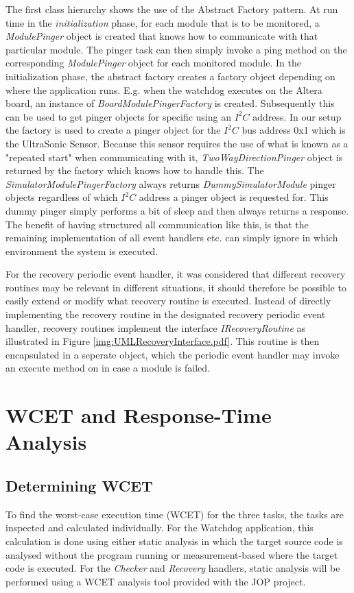 The first class hierarchy shows the use of the Abstract Factory pattern. At run time in the \emph{initialization} phase, for each module that is to be monitored, a \emph{ModulePinger} object is created that knows how to communicate with that particular module. The pinger task can then simply invoke a ping method on the corresponding \emph{ModulePinger} object for each monitored module. In the initialization phase, the abstract factory creates a factory object depending on where the application runs. E.g. when the watchdog executes on the Altera board, an instance of \emph{BoardModulePingerFactory} is created. Subsequently this can be used to get pinger objects for specific using an $\textit{I}^2\textit{C}$ address. In our setup the factory is used to create a pinger object for the $\textit{I}^2\textit{C}$ bus address 0x1 which is the UltraSonic Sensor. Because this sensor requires the use of what is known as a "repeated start" when communicating with it, \emph{TwoWayDirectionPinger} object is returned by the factory which knows how to handle this.
The \emph{SimulatorModulePingerFactory} always returns \emph{DummySimulatorModule} pinger objects regardless of which $\textit{I}^2\textit{C}$ address a pinger object is requested for. This dummy pinger simply performs a bit of sleep and then always returns a response. The benefit of having structured all communication like this, is that the remaining implementation of all event handlers etc. can simply ignore in which environment the system is executed.

For the recovery periodic event handler, it was considered that different recovery routines may be relevant in different situations, it should therefore be possible to easily extend or modify what recovery routine is executed. Instead of directly implementing the recovery routine in the designated recovery periodic event handler, recovery routines implement the interface \emph{IRecoveryRoutine} as illustrated in Figure \ref{img:UMLRecoveryInterface.pdf}. This routine is then encapsulated in a seperate object, which the periodic event handler may invoke an execute method on in case a module is failed.

\chapter{WCET and Response-Time Analysis}
\label{chapter:wcetrta}
\section{Determining WCET} %
\label{sec:determining_wcet}
To find the worst-case execution time (WCET) for the three tasks, the tasks are inspected and calculated individually. For the Watchdog application, this calculation is done using either static analysis in which the target source code is analysed without the program running or measurement-based where the target code is executed. For the \textit{Checker} and \textit{Recovery} handlers, static analysis will be performed using a WCET analysis tool provided with the JOP project. 



